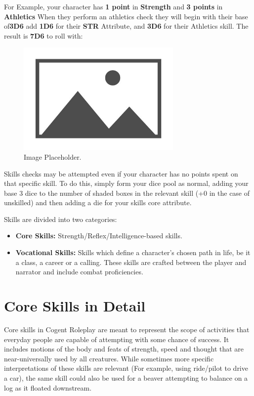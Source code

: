 For Example, your character has \textbf{1 point} in \textbf{Strength} and \textbf{3 points} in \textbf{Athletics} When they perform an athletics check they will begin with their base of\textbf{3D6} add \textbf{1D6} for their \textbf{STR} Attribute, and \textbf{3D6} for their Athletics skill. The result is \textbf{7D6} to roll with:

\begin{figure}[H]
    \includegraphics[width=8cm]{images/placeholder}
    \centering
    \caption{Image Placeholder.}
\end{figure}

Skills checks may be attempted even if your character has no points spent on that specific skill. To do this, simply form your dice pool as normal, adding your base 3 dice to the number of shaded boxes in the relevant skill (+0 in the case of unskilled) and then adding a die for your skills core attribute.

Skills are divided into two categories:

\begin{itemize}
    \item \textbf{Core Skills:} Strength/Reflex/Intelligence-based skills.
    \item \textbf{Vocational Skills:} Skills which define a character’s chosen path in life, be it a class, a career or a calling. These skills are crafted between the player and narrator and include combat proficiencies.
\end{itemize}

\section{Core Skills in Detail} \label{sec:core_skills_in_detail}

Core skills in Cogent Roleplay are meant to represent the scope of activities that everyday people are capable of attempting with some chance of success. It includes motions of the body and feats of strength, speed and thought that are near-universally used by all creatures. While sometimes more specific interpretations of these skills are relevant (For example, using ride/pilot to drive a car), the same skill could also be used for a beaver attempting to balance on a log as it floated downstream.

